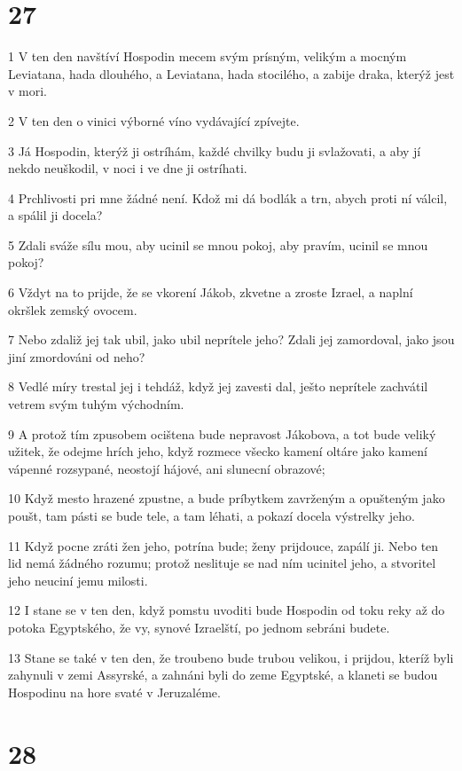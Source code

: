 \chapter{27}

\par 1 V ten den navštíví Hospodin mecem svým prísným, velikým a mocným Leviatana, hada dlouhého, a Leviatana, hada stocilého, a zabije draka, kterýž jest v mori.
\par 2 V ten den o vinici výborné víno vydávající zpívejte.
\par 3 Já Hospodin, kterýž ji ostríhám, každé chvilky budu ji svlažovati, a aby jí nekdo neuškodil, v noci i ve dne ji ostríhati.
\par 4 Prchlivosti pri mne žádné není. Kdož mi dá bodlák a trn, abych proti ní válcil, a spálil ji docela?
\par 5 Zdali sváže sílu mou, aby ucinil se mnou pokoj, aby pravím, ucinil se mnou pokoj?
\par 6 Vždyt na to prijde, že se vkorení Jákob, zkvetne a zroste Izrael, a naplní okršlek zemský ovocem.
\par 7 Nebo zdaliž jej tak ubil, jako ubil neprítele jeho? Zdali jej zamordoval, jako jsou jiní zmordováni od neho?
\par 8 Vedlé míry trestal jej i tehdáž, když jej zavesti dal, ješto neprítele zachvátil vetrem svým tuhým východním.
\par 9 A protož tím zpusobem ocištena bude nepravost Jákobova, a tot bude veliký užitek, že odejme hrích jeho, když rozmece všecko kamení oltáre jako kamení vápenné rozsypané, neostojí hájové, ani slunecní obrazové;
\par 10 Když mesto hrazené zpustne, a bude príbytkem zavrženým a opušteným jako poušt, tam pásti se bude tele, a tam léhati, a pokazí docela výstrelky jeho.
\par 11 Když pocne zráti žen jeho, potrína bude; ženy prijdouce, zapálí ji. Nebo ten lid nemá žádného rozumu; protož neslituje se nad ním ucinitel jeho, a stvoritel jeho neuciní jemu milosti.
\par 12 I stane se v ten den, když pomstu uvoditi bude Hospodin od toku reky až do potoka Egyptského, že vy, synové Izraelští, po jednom sebráni budete.
\par 13 Stane se také v ten den, že troubeno bude trubou velikou, i prijdou, kteríž byli zahynuli v zemi Assyrské, a zahnáni byli do zeme Egyptské, a klaneti se budou Hospodinu na hore svaté v Jeruzaléme.

\chapter{28}

